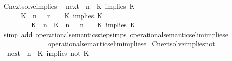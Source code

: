 \begin{isabellebody}
%
\isadelimproof
\isanewline
%
\endisadelimproof
\isanewline
{}\isamarkupfalse%
\ Cnext{\isacharunderscore}solve{\isacharunderscore}implies{\isacharcolon}\isanewline
\ \ {\isacartoucheopen}{\isacharparenleft}{\isasymC}\isactrlsub n\isactrlsub e\isactrlsub x\isactrlsub t\ {\isacharparenleft}{\isasymGamma}{\isacharcomma}\ n\ {\isasymturnstile}\ {\isacharparenleft}{\isacharparenleft}K\ implies\ K\ {\isacharhash}\ {\isasymPsi}{\isacharparenright}\ {\isasymtriangleright}\ {\isasymPhi}{\isacharparenright}{\isacharparenright}\isanewline
\ \ \ \ {\isasymsupseteq}\ {\isacharbraceleft}\ {\isacharparenleft}{\isacharparenleft}K\ {\isasymnot}{\isasymUp}\ n{\isacharparenright}\ {\isacharhash}\ {\isasymGamma}{\isacharparenright}{\isacharcomma}\ n\ {\isasymturnstile}\ {\isasymPsi}\ {\isasymtriangleright}\ {\isacharparenleft}{\isacharparenleft}K\ implies\ K\ {\isacharhash}\ {\isasymPhi}{\isacharparenright}{\isacharcomma}\isanewline
\ \ \ \ \ \ \ \ \ {\isacharparenleft}{\isacharparenleft}K\ {\isasymUp}\ n{\isacharparenright}\ {\isacharhash}\ {\isacharparenleft}K\ {\isasymUp}\ n{\isacharparenright}\ {\isacharhash}\ {\isasymGamma}{\isacharparenright}{\isacharcomma}\ n\ {\isasymturnstile}\ {\isasymPsi}\ {\isasymtriangleright}\ {\isacharparenleft}{\isacharparenleft}K\ implies\ K\ {\isacharhash}\ {\isasymPhi}{\isacharparenright}\ {\isacharbraceright}{\isacartoucheclose}\isanewline
%
\isadelimproof
%
\endisadelimproof
%
\isatagproof
{}\isamarkupfalse%
\ {\isacharparenleft}simp\ add{\isacharcolon}\ operational{\isacharunderscore}semantics{\isacharunderscore}step{\isachardot}simps\ operational{\isacharunderscore}semantics{\isacharunderscore}elim{\isachardot}implies{\isacharunderscore}e{}\isanewline
\ \ \ \ \ \ \ \ \ \ \ \ \ \ operational{\isacharunderscore}semantics{\isacharunderscore}elim{\isachardot}implies{\isacharunderscore}e{}{\isacharparenright}%
\endisatagproof
{\isafoldproof}%
%
\isadelimproof
\isanewline
%
\endisadelimproof
\isanewline
{}\isamarkupfalse%
\ Cnext{\isacharunderscore}solve{\isacharunderscore}implies{\isacharunderscore}not{\isacharcolon}\isanewline
\ \ {\isacartoucheopen}{\isacharparenleft}{\isasymC}\isactrlsub n\isactrlsub e\isactrlsub x\isactrlsub t\ {\isacharparenleft}{\isasymGamma}{\isacharcomma}\ n\ {\isasymturnstile}\ {\isacharparenleft}{\isacharparenleft}K\ implies\ not\ K\ {\isacharhash}\ {\isasymPsi}{\isacharparenright}\ {\isasymtriangleright}\ {\isasymPhi}{\isacharparenright}{\isacharparenright}\isanewline

\end{isabellebody}
